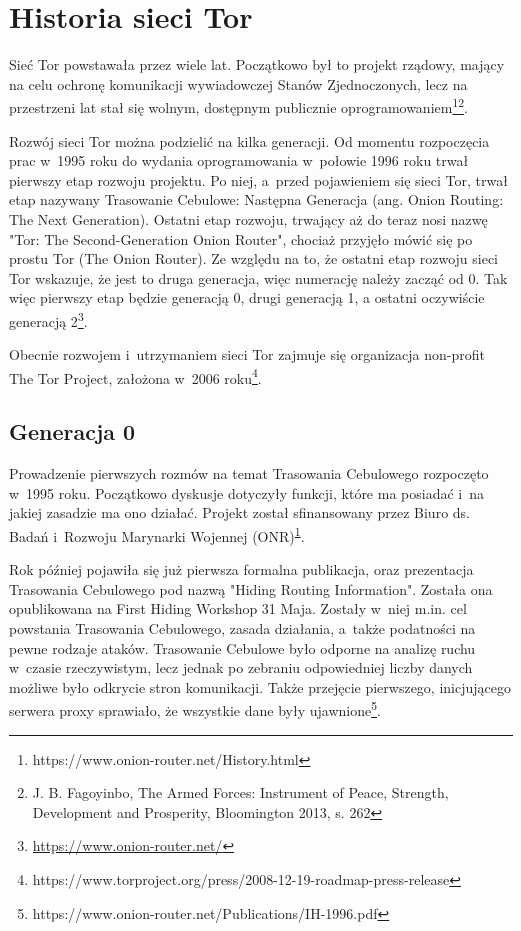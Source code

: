 \section{Historia sieci Tor}
Sieć Tor powstawała przez wiele lat. Początkowo był to projekt rządowy, mający na celu ochronę komunikacji wywiadowczej Stanów Zjednoczonych, lecz na przestrzeni lat stał się wolnym, dostępnym publicznie oprogramowaniem\footnote{https://www.onion-router.net/History.html\label{hist}}\footnote{J. B. Fagoyinbo, The Armed Forces: Instrument of Peace, Strength, Development and Prosperity, Bloomington 2013, s. 262}. 

Rozwój sieci Tor można podzielić na kilka generacji. Od momentu rozpoczęcia prac w~1995 roku do wydania oprogramowania w~połowie 1996 roku trwał pierwszy etap rozwoju projektu. Po niej, a~przed pojawieniem się sieci Tor, trwał etap nazywany Trasowanie Cebulowe: Następna Generacja (ang. Onion Routing: The Next Generation). Ostatni etap rozwoju, trwający aż do teraz nosi nazwę "Tor: The Second-Generation Onion Router", chociaż przyjęło mówić się po prostu Tor (The Onion Router). Ze względu na to, że ostatni etap rozwoju sieci Tor wskazuje, że jest to druga generacja, więc numerację należy zacząć od 0. Tak więc pierwszy etap będzie generacją 0, drugi generacją 1, a ostatni oczywiście generacją 2\footnote{\url{https://www.onion-router.net/}\label{onionrouter}}.

Obecnie rozwojem i~utrzymaniem sieci Tor zajmuje się organizacja non-profit The Tor Project, założona w~2006 roku\footnote{https://www.torproject.org/press/2008-12-19-roadmap-press-release}.

\subsection{Generacja 0}
Prowadzenie pierwszych rozmów na temat Trasowania Cebulowego rozpoczęto w~1995 roku. Początkowo dyskusje dotyczyły funkcji, które ma posiadać i~na jakiej zasadzie ma ono działać. Projekt został sfinansowany przez Biuro ds. Badań i~Rozwoju Marynarki Wojennej (ONR)\textsuperscript{\ref{hist}}.

Rok później pojawiła się już pierwsza formalna publikacja, oraz prezentacja Trasowania Cebulowego pod nazwą "Hiding Routing Information". Została ona opublikowana na First Hiding Workshop 31 Maja. Zostały w~niej m.in. cel powstania Trasowania Cebulowego, zasada działania, a~także podatności na pewne rodzaje ataków. Trasowanie Cebulowe było odporne na analizę ruchu w~czasie rzeczywistym, lecz jednak po zebraniu odpowiedniej liczby danych możliwe było odkrycie stron komunikacji. Także przejęcie pierwszego, inicjującego serwera proxy sprawiało, że wszystkie dane były ujawnione\footnote{https://www.onion-router.net/Publications/IH-1996.pdf\label{hri}}.

